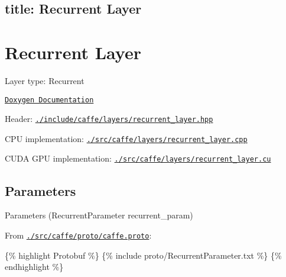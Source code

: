 

 \subsection*{title\+: Recurrent Layer }

\section*{Recurrent Layer}


\begin{DoxyItemize}
\item Layer type\+: {\ttfamily Recurrent}
\item \href{http://caffe.berkeleyvision.org/doxygen/classcaffe_1_1RecurrentLayer.html}{\tt Doxygen Documentation}
\item Header\+: \href{https://github.com/BVLC/caffe/blob/master/include/caffe/layers/recurrent_layer.hpp}{\tt {\ttfamily ./include/caffe/layers/recurrent\+\_\+layer.hpp}}
\item C\+PU implementation\+: \href{https://github.com/BVLC/caffe/blob/master/src/caffe/layers/recurrent_layer.cpp}{\tt {\ttfamily ./src/caffe/layers/recurrent\+\_\+layer.cpp}}
\item C\+U\+DA G\+PU implementation\+: \href{https://github.com/BVLC/caffe/blob/master/src/caffe/layers/recurrent_layer.cu}{\tt {\ttfamily ./src/caffe/layers/recurrent\+\_\+layer.cu}}
\end{DoxyItemize}

\subsection*{Parameters}


\begin{DoxyItemize}
\item Parameters ({\ttfamily Recurrent\+Parameter recurrent\+\_\+param})
\item From \href{https://github.com/BVLC/caffe/blob/master/src/caffe/proto/caffe.proto}{\tt {\ttfamily ./src/caffe/proto/caffe.proto}}\+:
\end{DoxyItemize}

\{\% highlight Protobuf \%\} \{\% include proto/\+Recurrent\+Parameter.\+txt \%\} \{\% endhighlight \%\} 